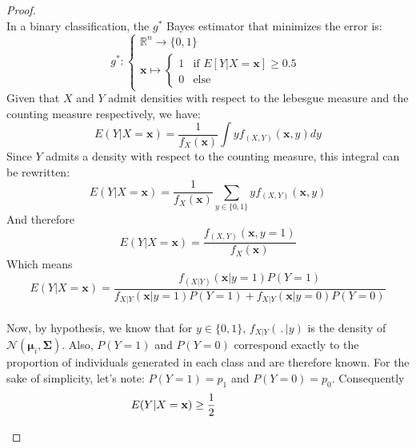 \documentclass[preprint,12pt]{elsarticle}
\begin{document}
\begin{proof} \phantom{A}\\
In a binary classification, the $g^*$ Bayes estimator that minimizes the error is:\\
\begin{equation}
    g^* : \begin{cases}
    \mathbb{R}^n \longrightarrow \{0, 1\} \\[3 pt]
    \mathbf{x} \longmapsto 
    \begin{cases}
        1 & \text{if } E[Y|X = \mathbf{x}] \geq 0.5  \\
        0 & \text{else}
    \end{cases}
    \end{cases}
\end{equation}
Given that $X$ and $Y$ admit densities with respect to the lebesgue measure and the counting measure respectively, we have:
\begin{equation}
    E(Y|X = \mathbf{x}) = \frac{1}{f_X(\mathbf{x})} \int\limits yf_{(X, Y)}(\mathbf{x}, y) dy
\end{equation}
Since $Y$ admits a density with respect to the counting measure, this integral can be rewritten:
\begin{equation}
    E(Y|X = \mathbf{x}) = \frac{1}{f_X(\mathbf{x})} \sum\limits_{y \in \{0,1\}} yf_{(X, Y)}(\mathbf{x}, y) 
\end{equation}
And therefore
\begin{equation}
    E(Y|X = \mathbf{x}) = \frac{f_{(X, Y)}(\mathbf{x}, y = 1)}{f_X(\mathbf{x})}
\end{equation}
Which means
\begin{equation}
    E(Y|X = \mathbf{x}) = \frac{f_{(X| Y)}(\mathbf{x}| y = 1) P(Y = 1)}{f_{X|Y}(\mathbf{x} | y = 1) P(Y = 1) + f_{X|Y}(\mathbf{x} | y = 0) P(Y = 0)}
\end{equation}
\phantom{a}\\
Now, by hypothesis, we know that for $y \in \{0, 1\}$, $f_{X|Y}(\,.\, |y)$ is the density of $\mathcal{N}(\bm{\mu}_i, \bm{\Sigma})$. Also, $P(Y = 1)$ and $P(Y = 0)$ correspond exactly to the proportion of individuals generated in each class and are therefore known. For the sake of simplicity, let's note: $P(Y = 1) = p_1$ and $P(Y = 0) = p_0$. Consequently\\ 
 \begin{align}
    E(Y|X = \mathbf{x}) \geq \frac{1}{2} \hspace{2 cm} \phantom{2} & \\[5 pt]

\end{align}
\end{proof}
\end{document}
